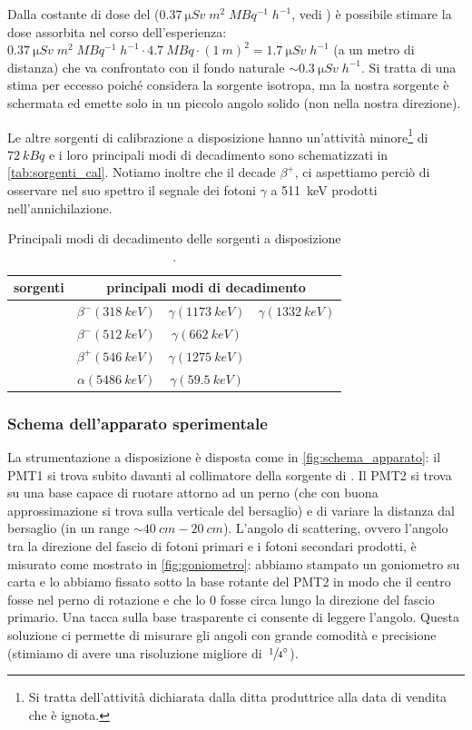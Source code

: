 Dalla costante di dose del \co\;  ($\SI{0.37}{\micro Sv\;m^2\;MBq^{-1}\;h^{-1}}$, vedi \cite{1}) è possibile stimare la dose assorbita nel corso dell'esperienza: $\SI{0.37}{\micro Sv\;m^2\;MBq^{-1}\;h^{-1}} \cdot \SI{4.7}{MBq} \cdot (\SI{1}{m})^2= \SI{1.7}{\micro Sv\;h^{-1}}$ (a un metro di distanza) che va confrontato con il fondo naturale $\sim\SI{0.3}{\micro Sv\;h^{-1}}$. Si tratta di una stima per eccesso poiché considera la sorgente isotropa, ma la nostra sorgente è schermata ed emette solo in un piccolo angolo solido (non nella nostra direzione).

Le altre sorgenti di calibrazione a disposizione hanno un'attività minore\footnote{Si tratta dell'attività dichiarata dalla ditta produttrice alla data di vendita che è ignota.} di $\SI{72}{kBq}$ e i loro principali modi di decadimento sono schematizzati in \autoref{tab:sorgenti_cal}. Notiamo inoltre che il \na{} decade $\beta^+$, ci aspettiamo perciò di osservare nel suo spettro il segnale dei fotoni $\gamma$ a \SI{511}{keV} prodotti nell'annichilazione.

\begin{table}[h]
	\centering
	\begin{tabular}{cccc}
		\toprule
		sorgenti & \multicolumn{3}{c}{principali modi di decadimento} \\
		\midrule
		\co & $\beta^{-} (\SI{318}{keV})$ & $\gamma (\SI{1173}{keV})$ & $\gamma (\SI{1332}{keV})$  \\
		\cs & $\beta^{-} (\SI{512}{keV})$ & $\gamma (\SI{662}{keV})$ \\
		\na & $\beta^{+} (\SI{546}{keV})$ & $\gamma (\SI{1275}{keV})$ \\
		\am & $\alpha (\SI{5486}{keV})$ & $\gamma (\SI{59.5}{keV})$ \\
		\bottomrule
	\end{tabular}
	\caption{\label{tab:sorgenti_cal} Principali modi di decadimento delle sorgenti a disposizione \cite{2}.}
\end{table} 

\subsubsection{Schema dell'apparato sperimentale}
La strumentazione a disposizione è disposta come in \autoref{fig:schema_apparato}: il PMT1 si trova subito davanti al collimatore della sorgente di \co. Il PMT2 si trova su una base capace di ruotare attorno ad un perno (che con buona approssimazione si trova sulla verticale del bersaglio) e di variare la distanza dal bersaglio (in un range $\sim\SI{40}{cm}-\SI{20}{cm}$).
L'angolo di scattering, ovvero l'angolo tra la direzione del fascio di fotoni primari e i fotoni secondari prodotti, è misurato come mostrato in \autoref{fig:goniometro}: abbiamo stampato un goniometro su carta e lo abbiamo fissato sotto la base rotante del PMT2 in modo che il centro fosse nel perno di rotazione e che lo 0 fosse circa lungo la direzione del fascio primario. Una tacca sulla base trasparente ci consente di leggere l'angolo. Questa soluzione ci permette di misurare gli angoli con grande comodità e precisione (stimiamo di avere una risoluzione migliore di~$\sfrac14 \si{\degree}$).

